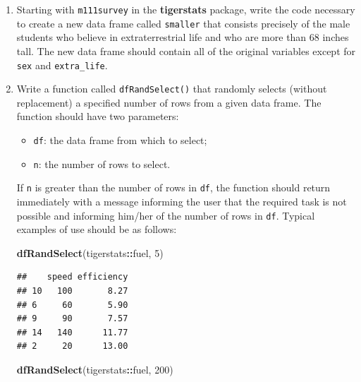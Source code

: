 \documentclass[]{book}
\makeatletter
\newenvironment{Shaded}{\begin{snugshade}}{\end{snugshade}}
\newcommand{\KeywordTok}[1]{\textcolor[rgb]{0.13,0.29,0.53}{\textbf{#1}}}
\newcommand{\DecValTok}[1]{\textcolor[rgb]{0.00,0.00,0.81}{#1}}
\newcommand{\OperatorTok}[1]{\textcolor[rgb]{0.81,0.36,0.00}{\textbf{#1}}}
\newcommand{\NormalTok}[1]{#1}
\providecommand{\tightlist}{%
  \setlength{\itemsep}{0pt}\setlength{\parskip}{0pt}}
\newenvironment{kframe}{%
\medskip{}
\setlength{\fboxsep}{.8em}
 \def\at@end@of@kframe{}%
 \ifinner\ifhmode%
  \def\at@end@of@kframe{\end{minipage}}%
  \begin{minipage}{\columnwidth}%
 \fi\fi%
 \def\FrameCommand##1{\hskip\@totalleftmargin \hskip-\fboxsep
 \colorbox{shadecolor}{##1}\hskip-\fboxsep
     \hskip-\linewidth \hskip-\@totalleftmargin \hskip\columnwidth}%
 \MakeFramed {\advance\hsize-\width
   \@totalleftmargin\z@ \linewidth\hsize
   \@setminipage}}%
 {\par\unskip\endMakeFramed%
 \at@end@of@kframe}
\renewenvironment{Shaded}{\begin{kframe}}{\end{kframe}}
\theoremstyle{definition}
\theoremstyle{definition}
\theoremstyle{definition}
\theoremstyle{remark}
\makeatother
\begin{document}
{\begin{enumerate}
\begin{verbatim}
## [1]  21  57  93 129
\end{verbatim}
\item
  Starting with \texttt{m111survey} in the \textbf{tigerstats} package,
  write the code necessary to create a new data frame called
  \texttt{smaller} that consists precisely of the male students who
  believe in extraterrestrial life and who are more than 68 inches tall.
  The new data frame should contain all of the original variables except
  for \texttt{sex} and \texttt{extra\_life}.
\item
  Write a function called \texttt{dfRandSelect()} that randomly selects
  (without replacement) a specified number of rows from a given data
  frame. The function should have two parameters:

  \begin{itemize}
  \tightlist
  \item
    \texttt{df}: the data frame from which to select;
  \item
    \texttt{n}: the number of rows to select.
  \end{itemize}

  If \texttt{n} is greater than the number of rows in \texttt{df}, the
  function should return immediately with a message informing the user
  that the required task is not possible and informing him/her of the
  number of rows in \texttt{df}. Typical examples of use should be as
  follows:

\begin{Shaded}
\begin{Highlighting}[]
\KeywordTok{dfRandSelect}\NormalTok{(tigerstats}\OperatorTok{::}\NormalTok{fuel, }\DecValTok{5}\NormalTok{)}
\end{Highlighting}
\end{Shaded}

\begin{verbatim}
##    speed efficiency
## 10   100       8.27
## 6     60       5.90
## 9     90       7.57
## 14   140      11.77
## 2     20      13.00
\end{verbatim}

\begin{Shaded}
\begin{Highlighting}[]
\KeywordTok{dfRandSelect}\NormalTok{(tigerstats}\OperatorTok{::}\NormalTok{fuel, }\DecValTok{200}\NormalTok{)}
\end{Highlighting}
\end{Shaded}


\end{enumerate}}
\end{document}
